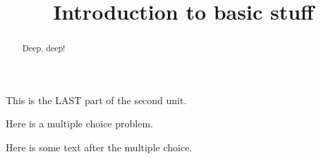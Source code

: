 \documentclass{ximera}
\title{Introduction to basic stuff}
\begin{document}
\begin{abstract}
  Deep, deep!
\end{abstract}

This is the LAST part of the second unit.

\begin{exercise}
  Here is a multiple choice problem.
  \begin{solution}
    \begin{multiple-choice}
    \end{multiple-choice}
  \end{solution}

  Here is some text after the multiple choice.
\end{exercise}
\end{document}
